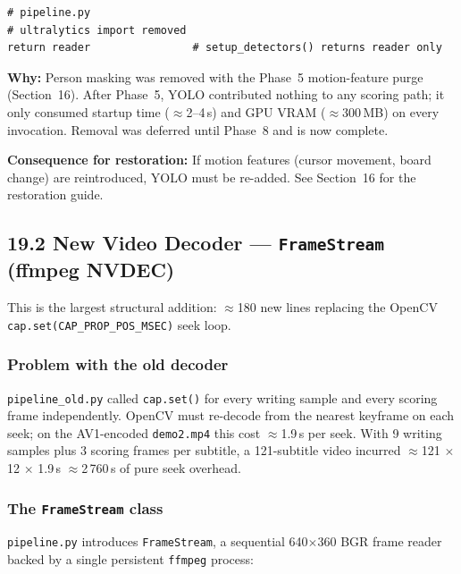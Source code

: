\documentclass[11pt]{article}
\begin{document}
\begin{verbatim}
# pipeline.py
# ultralytics import removed
return reader                # setup_detectors() returns reader only
\end{verbatim}

\textbf{Why:} Person masking was removed with the Phase~5 motion-feature purge
(Section~16).  After Phase~5, YOLO contributed nothing to any scoring path; it
only consumed startup time ($\approx$2--4\,s) and GPU VRAM ($\approx$300\,MB)
on every invocation.  Removal was deferred until Phase~8 and is now complete.

\textbf{Consequence for restoration:} If motion features (cursor movement, board
change) are reintroduced, YOLO must be re-added.  See Section~16 for the
restoration guide.

\subsection*{19.2 New Video Decoder --- \texttt{FrameStream} (ffmpeg NVDEC)}

This is the largest structural addition: $\approx$180 new lines replacing the
OpenCV \texttt{cap.set(CAP\_PROP\_POS\_MSEC)} seek loop.

\subsubsection*{Problem with the old decoder}

\texttt{pipeline\_old.py} called \texttt{cap.set()} for every writing sample and
every scoring frame independently.  OpenCV must re-decode from the nearest
keyframe on each seek; on the AV1-encoded \texttt{demo2.mp4} this cost
$\approx$1.9\,s per seek.  With 9 writing samples plus 3 scoring frames per subtitle,
a 121-subtitle video incurred $\approx$121 $\times$ 12 $\times$ 1.9\,s $\approx$2\,760\,s
of pure seek overhead.

\subsubsection*{The \texttt{FrameStream} class}

\texttt{pipeline.py} introduces \texttt{FrameStream}, a sequential 640$\times$360
BGR frame reader backed by a single persistent \texttt{ffmpeg} process:
\end{document}
